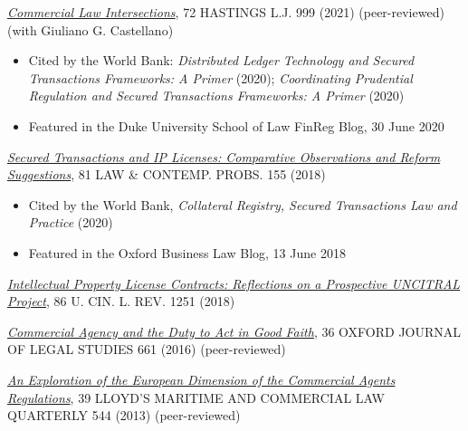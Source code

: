 \documentclass[
  11pt,
  letterpaper]{article}
\begin{document}
\vspace{0.5em}\noindent\href{https://www.andreatosato.com/articles/commercial-law-intersections}{\textit{Commercial Law Intersections}},
72 {\fontsize{9.5}{11}\selectfont\MakeUppercase{Hastings L.J.}} 999
(2021) (peer-reviewed) (with Giuliano G. Castellano)

\begin{itemize}
\item Cited by the World Bank: \textit{Distributed Ledger Technology and Secured Transactions Frameworks: A Primer} (2020); \textit{Coordinating Prudential Regulation and Secured Transactions Frameworks: A Primer} (2020)
\item Featured in the Duke University School of Law FinReg Blog, 30 June 2020
\end{itemize}

\vspace{0.5em}\noindent\href{https://www.andreatosato.com/articles/secured-transactions-ip-licenses}{\textit{Secured Transactions and IP Licenses: Comparative Observations and Reform Suggestions}},
81 {\fontsize{9.5}{11}\selectfont\MakeUppercase{Law \& Contemp. Probs.}}
155 (2018)

\begin{itemize}
\item Cited by the World Bank, \textit{Collateral Registry, Secured Transactions Law and Practice} (2020)
\item Featured in the Oxford Business Law Blog, 13 June 2018
\end{itemize}

\vspace{0.5em}\noindent\href{https://www.andreatosato.com/articles/ip-license-contracts}{\textit{Intellectual Property License Contracts: Reflections on a Prospective UNCITRAL Project}},
86 {\fontsize{9.5}{11}\selectfont\MakeUppercase{U. Cin. L. Rev.}} 1251
(2018)

\vspace{0.5em}\noindent\href{https://www.andreatosato.com/articles/commercial-agency-good-faith}{\textit{Commercial Agency and the Duty to Act in Good Faith}},
36
{\fontsize{9.5}{11}\selectfont\MakeUppercase{Oxford Journal of Legal Studies}}
661 (2016) (peer-reviewed)

\vspace{0.5em}\noindent\href{https://www.andreatosato.com/articles/european-dimension-commercial-agents}{\textit{An Exploration of the European Dimension of the Commercial Agents Regulations}},
39
{\fontsize{9.5}{11}\selectfont\MakeUppercase{Lloyd's Maritime and Commercial Law Quarterly}}
544 (2013) (peer-reviewed)
\end{document}
